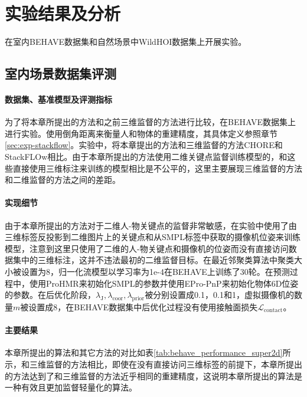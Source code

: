 \section{实验结果及分析}
在室内BEHAVE数据集和自然场景中WildHOI数据集上开展实验。

\subsection{室内场景数据集评测}

\paragraph{数据集、基准模型及评测指标} 
为了将本章所提出的方法和之前三维监督的方法进行比较，在BEHAVE数据集上进行实验。使用倒角距离来衡量人和物体的重建精度，其具体定义参照章节\ref{sec:exp-stackflow}。实验中，将本章提出的方法和三维监督的方法CHORE\citep{xie2022chore}和StackFLOw\citep{ijcai2023p100}相比。由于本章所提出的方法使用二维关键点监督训练模型的，和这些直接使用三维标注来训练的模型相比是不公平的，这里主要展现三维监督的方法和二维监督的方法之间的差距。

\paragraph{实现细节}
由于本章所提出的方法对于二维人-物关键点的监督非常敏感，在实验中使用了由三维标签反投影到二维图片上的关键点和从SMPL标签中获取的摄像机位姿来训练模型，注意到这里只使用了二维的人-物关键点和摄像机的位姿而没有直接访问数据集中的三维标注，这并不违法最初的二维监督目标。在最近邻聚类算法中聚类大小被设置为8，归一化流模型以学习率为1e-4在BEHAVE上训练了30轮。在预测过程中，使用ProHMR\citep{Kolotouros2021ProbabilisticMF}来初始化SMPL的参数并使用EPro-PnP\citep{Chen_2022_CVPR:epro_pnp}来初始化物体6D位姿的参数。在后优化阶段，$\lambda_{\text{J}}, \lambda_{\text{coor}}, \lambda_{\text{prior}}$被分别设置成0.1，0.1和1，虚拟摄像机的数量$m$被设置成8，在BEHAVE数据集中后优化过程没有使用接触面损失$\mathcal{L}_{\text{contact}}$。

\paragraph{主要结果} 本章所提出的算法和其它方法的对比如表\ref{tab:behave_performance_super2d}所示，和三维监督的方法相比，即使在没有直接访问三维标签的前提下，本章所提出的方法达到了和三维监督的方法近乎相同的重建精度，这说明本章所提出的算法是一种有效且更加监督轻量化的算法。

